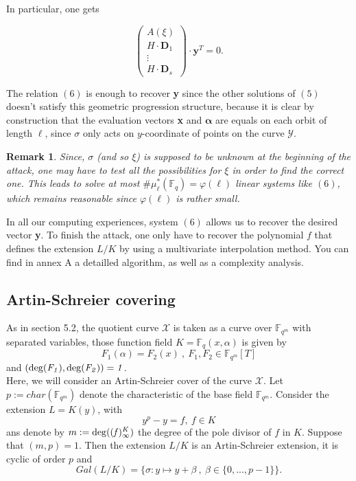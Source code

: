 \documentclass[10pt]{article}
\newtheorem{rq1}{Remark}[]
\newcommand{\s}{\vspace{0.3cm}}
\newcommand{\cd}{\cdot}
\newcommand{\fqm}{\mathbb{F}_{q^m}}
\newcommand{\fq}{\mathbb{F}_q}
\newcommand{\X}{\mathcal{X}}
\newcommand{\Y}{\mathcal{Y}}
\begin{document}
In particular, one gets


\begin{equation}
\begin{pmatrix}
A(\xi) \\
H \cd \textbf{D}_1 \\
\vdots \\
H \cd \textbf{D}_s
\end{pmatrix}
\cd \textbf{y}^T = 0.
\end{equation}

The relation $(6)$ is enough to recover \textbf{y} since the other solutions of $(5)$ doesn't satisfy this geometric progression structure, because it is clear by construction that the evaluation vectors \textbf{x} and $\boldsymbol{\alpha}$ are equals on each orbit of length $\ell$, since $\sigma$ only acts on $y$-coordinate of points on the curve $\Y$. 

\s

\begin{rq1} \rm
Since, $\sigma$ (and so $\xi$) is supposed to be unknown at the beginning of the attack, one may have to test all the possibilities for $\xi$ in order to find the correct one. This leads to solve at most $\#\mu^*_{\ell}(\fq) = \varphi(\ell)$ linear systems like $(6)$, which remains reasonable since $\varphi(\ell)$ is rather small.
\end{rq1}

\s

In all our computing experiences, system $(6)$ allows us to recover the desired vector \textbf{y}. To finish the attack, one only have to recover the polynomial $f$ that defines the extension $L/K$ by using a multivariate interpolation method. You can find in annex A a detailled algorithm, as well as a complexity analysis.

\s


\subsection{Artin-Schreier covering}

\s

As in section 5.2, the quotient curve $\X$ is taken as a curve over $\fqm$ with separated variables, those function field $K = \fq(x,\alpha)$ is given by 
\[F_1(\alpha) = F_2(x) \ , \ F_1,F_2 \in \fqm[T]\]
and $(\rm{deg}\it(F_1),\rm{deg}\it(F_2))=1$. \\ 
Here, we will consider an Artin-Schreier cover of the curve $\X$.
Let $p:=char(\fqm)$ denote the characteristic of the base field $\fqm$. Consider the extension $L=K(y)$, with
\[y^p-y = f , \ f \in K\]
ans denote by $m:=\rm{deg}\it((f)^K_{\infty})$ the degree of the pole divisor of $f$ in $K$. Suppose that $(m,p)=1$. Then the extension $L/K$ is an Artin-Schreier extension, it is cyclic of order $p$ and 
\[Gal(L/K) = \{ \sigma : y \mapsto y + \beta \ , \ \beta \in \{0,...,p-1\}\}.\]
\end{document}
